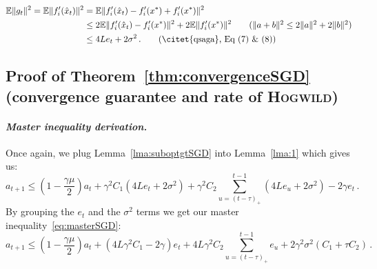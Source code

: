 \documentclass[twoside, 11pt]{article}
\newcommand{\stepsize}{\gamma}
\newcommand{\strongconvex}{\mu}
\newcommand{\overlap}{\tau}
\newcommand{\lipschitz}{L}
\newcommand{\E}{\mathbb{E}}
\newcommand{\Hogwild}{\textsc{Hogwild}}
\begin{document}
\begin{align}
\E \|g_t\|^2
= \E \|f'_i(\hat x_t)\|^2
&= \E \|f'_i(\hat x_t) - f'_i(x^*) + f'_i(x^*)\|^2
\nonumber
\\
&\leq 2\E \|f'_i(\hat x_t) - f'_i(x^*)\|^2 + 2\E \|f'_i(x^*)\|^2
\tag*{$(\|a + b\|^2 \leq 2\|a\|^2 + 2\|b\|^2)$}
\\
&\leq 4 \lipschitz e_t + 2 \sigma^2 \,.
\tag*{(\citet{qsaga}, Eq (7) \& (8))}
\end{align}
\hfill\BlackBox
\subsection{Proof of Theorem~\ref{thm:convergenceSGD} (convergence guarantee and rate of \Hogwild)}\label{apx:SGDtheorem}
\paragraph{\textit{Master inequality derivation.}}
Once again, we plug Lemma~\ref{lma:suboptgtSGD} into Lemma~\ref{lma:1} which gives us:
\begin{equation}
a_{t+1}
\leq (1 - \frac{\stepsize\strongconvex}{2})a_t
+ \stepsize^2 C_1 (4\lipschitz e_t + 2\sigma^2)
+ \stepsize^2 C_2 \sum_{u = (t - \overlap)_+}^{t-1} (4\lipschitz e_u + 2\sigma^2)
- 2\stepsize e_t \,.
\end{equation}
By grouping the $e_t$ and the $\sigma^2$ terms we get our master inequality~\eqref{eq:masterSGD}:
\begin{equation*}
a_{t+1}
\leq (1 - \frac{\stepsize\strongconvex}{2})a_t
+ (4\lipschitz \stepsize^2 C_1 - 2 \stepsize) e_t
+ 4\lipschitz \stepsize^2 C_2 \sum_{u = (t - \overlap)_+}^{t-1} e_u
+ 2 \stepsize^2 \sigma^2 (C_1 +  \overlap C_2)\,.
\end{equation*}
\end{document}
